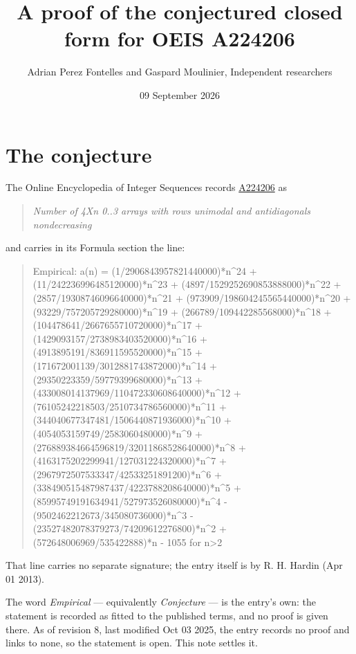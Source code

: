 \documentclass[11pt]{article}
\title{A proof of the conjectured closed form for OEIS A224206}
\author{Adrian Perez Fontelles and Gaspard Moulinier, Independent researchers}
\date{09 September 2026}
\theoremstyle{definition}
\begin{document}
\maketitle
\section{The conjecture}

The Online Encyclopedia of Integer Sequences records \href{https://oeis.org/A224206}{A224206} as

\begin{quote}\itshape Number of 4Xn 0..3 arrays with rows unimodal and antidiagonals nondecreasing\end{quote}

and carries in its Formula section the line:

\begin{quote}\ttfamily Empirical: a(n) = (1/2906843957821440000)*n\textasciicircum{}24 + (11/242236996485120000)*n\textasciicircum{}23 + (4897/1529252690853888000)*n\textasciicircum{}22 + (2857/19308746096640000)*n\textasciicircum{}21 + (973909/198604245565440000)*n\textasciicircum{}20 + (93229/757205729280000)*n\textasciicircum{}19 + (266789/109442285568000)*n\textasciicircum{}18 + (104478641/2667655710720000)*n\textasciicircum{}17 + (1429093157/2738983403520000)*n\textasciicircum{}16 + (4913895191/836911595520000)*n\textasciicircum{}15 + (171672001139/3012881743872000)*n\textasciicircum{}14 + (29350223359/59779399680000)*n\textasciicircum{}13 + (433008014137969/110472330608640000)*n\textasciicircum{}12 + (76105242218503/2510734786560000)*n\textasciicircum{}11 + (344040677347481/1506440871936000)*n\textasciicircum{}10 + (4054053159749/2583060480000)*n\textasciicircum{}9 + (276889384664596819/32011868528640000)*n\textasciicircum{}8 + (4163175202299941/127031224320000)*n\textasciicircum{}7 + (2967972507533347/42533251891200)*n\textasciicircum{}6 + (338490515487987437/4223788208640000)*n\textasciicircum{}5 + (85995749191634941/527973526080000)*n\textasciicircum{}4 - (9502462212673/345080736000)*n\textasciicircum{}3 - (23527482078379273/74209612276800)*n\textasciicircum{}2 + (572648006969/535422888)*n - 1055 for n>2\end{quote}

That line carries no separate signature; the entry itself is by R. H. Hardin (Apr 01 2013).

The word {\itshape Empirical} --- equivalently {\itshape Conjecture} --- is the entry's own: the statement is recorded as fitted to the published terms, and no proof is given there. As of revision 8, last modified Oct 03 2025, the entry records no proof and links to none, so the statement is open. This note settles it.
\end{document}
